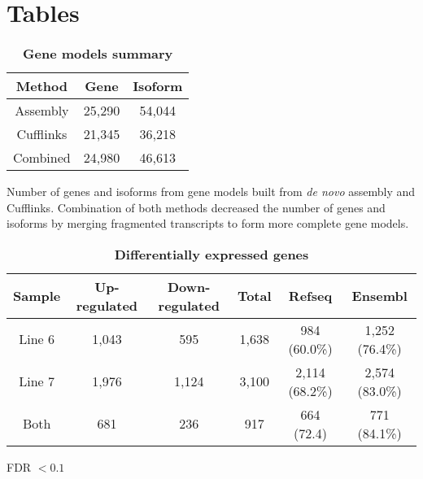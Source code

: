 \documentclass[10pt]{article}
\begin{document}
\section*{Tables}

\begin{table}[!ht]
\caption{
\bf{Gene models summary}}
\begin{tabular}{ccc}
\hline
Method & Gene & Isoform \\
\hline
Assembly & 25,290 & 54,044 \\
Cufflinks & 21,345 & 36,218 \\
Combined & 24,980 & 46,613 \\
\hline
\end{tabular}
\begin{flushleft}Number of genes and isoforms from gene models
built from \emph{de novo} assembly and Cufflinks.
Combination of both methods decreased the number of genes
and isoforms by merging fragmented transcripts to
form more complete gene models.
\end{flushleft}
\label{tab:gene_models}
\end{table}

\begin{table}[!ht]
\caption{
\bf{Differentially expressed genes}}
\begin{tabular}{cccccc}
\hline
Sample & Up-regulated & Down-regulated & Total & Refseq & Ensembl\\
\hline
Line 6 & 1,043 & 595 & 1,638 & 984 (60.0\%) & 1,252 (76.4\%) \\
Line 7 & 1,976 & 1,124 & 3,100 & 2,114 (68.2\%) & 2,574 (83.0\%) \\
Both & 681 & 236 & 917 & 664 (72.4) & 771 (84.1\%) \\
\hline
\end{tabular}
\begin{flushleft}
FDR $< 0.1$
\end{flushleft}
\label{tab:dge}
\end{table}
\end{document}
